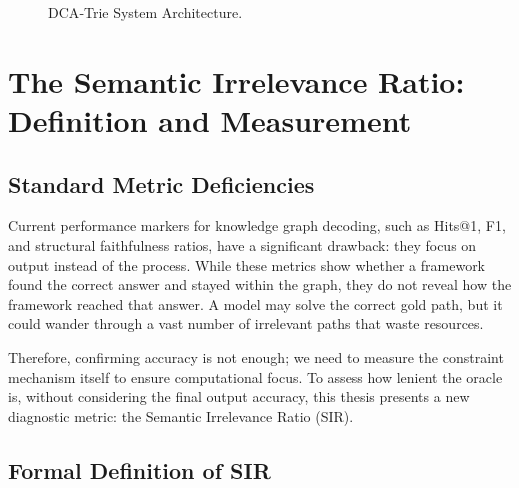 \begin{figure}
{
  }%
  \caption[DCA‑Trie System Architecture]{DCA‑Trie System Architecture.}
  \label{fig:architecture}
\end{figure}

\section{The Semantic Irrelevance Ratio: Definition and Measurement}
\label{sec:ch3sir}

\subsection{Standard Metric Deficiencies}

Current performance markers for knowledge graph decoding, such as Hits@1, F1, and structural faithfulness ratios, have a significant drawback: they focus on output instead of the process. While these metrics show whether a framework found the correct answer and stayed within the graph, they do not reveal how the framework reached that answer. A model may solve the correct gold path, but it could wander through a vast number of irrelevant paths that waste resources.

Therefore, confirming accuracy is not enough; we need to measure the constraint mechanism itself to ensure computational focus. To assess how lenient the oracle is, without considering the final output accuracy, this thesis presents a new diagnostic metric: the Semantic Irrelevance Ratio (SIR).

\subsection{Formal Definition of SIR}

